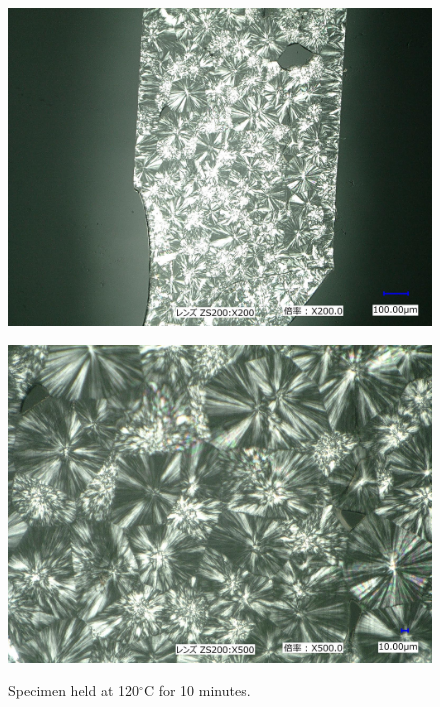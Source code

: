 \begin{figure}[htbp]
    \begin{minipage}[htbp]{0.45\linewidth}
      \centering
      \includegraphics[keepaspectratio, scale=0.1]{Data/観察結果/120_10min_200.jpg}
      \label{fig:120度200}
    \end{minipage}
    \begin{minipage}[htbp]{0.45\linewidth}
      \centering
      \includegraphics[keepaspectratio, scale=0.1]{Data/観察結果/120_10min_500.jpg}
      \label{fig:120度500}
    \end{minipage}
    \centering
    \caption{Specimen held at 120$^\circ$C for 10 minutes.}
    \label{fig:120度}
\end{figure}